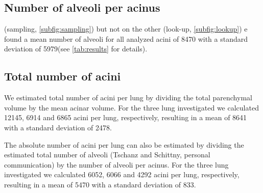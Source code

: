 \documentclass[final,paper=a4,DIV=calc,abstract,english]{scrartcl}
\newcommand{\totalnumberofaciniB}{12145\xspace}
\newcommand{\totalnumberofaciniD}{6914\xspace}
\newcommand{\totalnumberofaciniE}{6865\xspace}
\newcommand{\meantotalnumberofacini}{8641\xspace}
\newcommand{\meantotalnumberofaciniSTD}{2478\xspace} %
\newcommand{\totalnumberofaciniBVariant}{6052\xspace}
\newcommand{\totalnumberofaciniDVariant}{6066\xspace}
\newcommand{\totalnumberofaciniEVariant}{4292\xspace}
\newcommand{\meantotalnumberofaciniVariant}{5470\xspace}
\newcommand{\meantotalnumberofaciniSTDVariant}{833\xspace} %
\newcommand{\meannumberofalveoli}{8470\xspace} %
\newcommand{\meannumberofalveoliSTD}{5979\xspace}
\begin{document}
\subsection{Number of alveoli per acinus}
 (sampling, \autoref{subfig:sampling}) but not on the other  (look-up, \autoref{subfig:lookup}) e found a mean number of alveoli for all analyzed acini of \meannumberofalveoli with a standard deviation of \meannumberofalveoliSTD (see \autoref{tab:results} for details).

\subsection{Total number of acini}\label{sec:results:total number of acini}
We estimated  total number of acini per lung by dividing the total parenchymal volume by the mean acinar volume.
For the three lung investigated we calculated \totalnumberofaciniB, \totalnumberofaciniD and \totalnumberofaciniE acini per lung, respectively, resulting in a mean of \meantotalnumberofacini with a standard deviation of \meantotalnumberofaciniSTD.

The absolute number of acini per lung can also be estimated by dividing the estimated total number of alveoli  (Tschanz and Schittny, personal communication) by the number of alveoli per acinus.
For the three lung investigated we calculated \totalnumberofaciniBVariant, \totalnumberofaciniDVariant and \totalnumberofaciniEVariant acini per lung, respectively, resulting in a mean of \meantotalnumberofaciniVariant with a standard deviation of \meantotalnumberofaciniSTDVariant.
\end{document}
